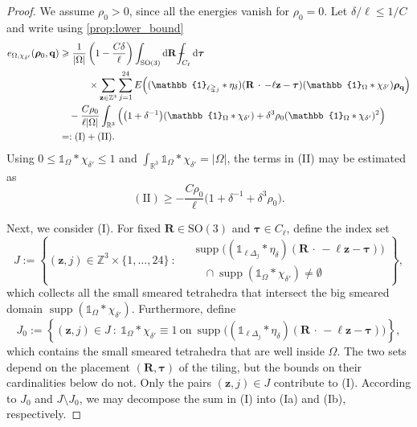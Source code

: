 \documentclass[final,reqno]{amsart}
\theoremstyle{remark}
\renewcommand{\le}{\leqslant}
\renewcommand{\ge}{\geqslant}
\DeclareMathOperator{\supp}{supp}
\newcommand{\RR}{\mathbb{R}}
\newcommand{\ZZ}{\mathbb{Z}}
\newcommand{\SO}{\mathrm{SO}}
\newcommand{\iden}{\mathbb{1}}
\newcommand{\tetra}{\mathbb{\Delta}}
\newcommand{\dd}{\mathrm{d}}
\def\Xint#1{\mathchoice
{\XXint\displaystyle\textstyle{#1}}
{\XXint\textstyle\scriptstyle{#1}}
{\XXint\scriptstyle\scriptscriptstyle{#1}}
{\XXint\scriptscriptstyle\scriptscriptstyle{#1}}
\!\int}
\def\XXint#1#2#3{{\setbox0=\hbox{$#1{#2#3}{\int}$ }
\vcenter{\hbox{$#2#3$ }}\kern-.6\wd0}}
\def\dashint{\Xint-}
\begin{document}
\begin{proof}
We assume $\rho_0>0$, since all the energies vanish for $\rho_0=0$. Let $\delta/\ell\le1/C$ and write using \cref{prop:lower_bound}
\begin{align*}
 e_{\Omega,\chi_{\delta'}}(\bm{\rho}_0,\mathbf{q})
 &\ge\frac{1}{|\Omega|}\left(1-\frac{C\delta}{\ell}\right)\int_{\SO(3)}\dd\mathbf{R}\,\dashint_{C_\ell}\dd\bm{\tau}\\
 &\qquad\quad\times\sum_{\mathbf{z}\in\ZZ^3}\sum_{j=1}^{24}
 E\Big((\iden_{\ell\tetra_j}\ast\eta_\delta)(\mathbf{R}\,\cdot\,-\ell\mathbf{z}-\bm{\tau})(\iden_\Omega\ast\chi_{\delta'})\bm{\rho}_{\mathbf{q}}\Big)\\
 &\quad-\frac{C\rho_0}{\ell|\Omega|}\int_{\RR^3}\Big(\big(1+\delta^{-1}\big)(\iden_\Omega\ast\chi_{\delta'})+\delta^3\rho_0(\iden_\Omega\ast\chi_{\delta'})^2\Big)\\
 &=:\mathrm{(I)}+\mathrm{(II)}.
\end{align*}
Using $0\le\iden_\Omega\ast\chi_{\delta'}\le1$ and $\int_{\RR^3}\iden_\Omega\ast\chi_{\delta'}=|\Omega|$, the terms in (II) may be estimated as
\[
 \mathrm{(II)}\ge-\frac{C\rho_0}{\ell}\big(1+\delta^{-1}+\delta^3\rho_0\big).
\]

Next, we consider (I). For fixed $\mathbf{R}\in\SO(3)$ and $\bm{\tau}\in C_\ell$, define the index set
\[
 J:=\left\{(\mathbf{z},j)\in\ZZ^3\times\{1,\ldots,24\}\ :\
 \begin{aligned}
 &\supp\big((\iden_{\ell\tetra_j}\ast\eta_\delta)(\mathbf{R}\,\cdot\,-\ell\mathbf{z}-\bm{\tau})\big)\\
 &\quad\cap\supp(\iden_\Omega\ast\chi_{\delta'})\neq\emptyset
 \end{aligned}\right\},
\]
which collects all the small smeared tetrahedra that intersect the big smeared domain $\supp(\iden_\Omega\ast\chi_{\delta'})$. Furthermore, define
\[
 J_0:=\left\{(\mathbf{z},j)\in J\ :\
 \iden_\Omega\ast\chi_{\delta'}\equiv1\ \text{on}\
 \supp\big((\iden_{\ell\tetra_j}\ast\eta_\delta)(\mathbf{R}\,\cdot\,-\ell\mathbf{z}-\bm{\tau})\big)\right\},
\]
which contains the small smeared tetrahedra that are well inside $\Omega$. The two sets depend on the placement $(\mathbf{R},\bm{\tau})$ of the tiling, but the bounds on their cardinalities below do not. Only the pairs $(\mathbf{z},j)\in J$ contribute to (I). According to $J_0$ and $J\setminus J_0$, we may decompose the sum in (I) into (Ia) and (Ib), respectively.


\end{proof}
\end{document}
